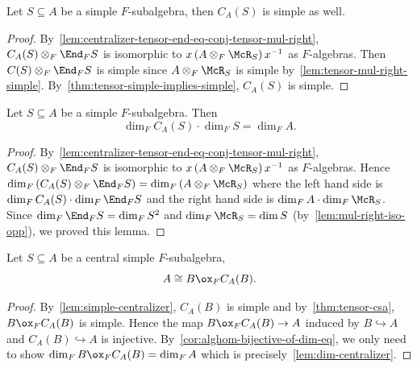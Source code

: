  \begin{lemma}\label{lem:simple-centralizer}
   Let $S\subseteq A$ be a simple $F$-subalgebra, then
   $C_{A}(S)$ is simple as well.
   \leanok
 \end{lemma}

 \begin{proof}
   By~\cref{lem:centralizer-tensor-end-eq-conj-tensor-mul-right},
   $C_{A}(S) \otimes_{F}\End_{F}S$ is isomorphic to
   $x\left(A\otimes_{F}\McR_{S}\right)x^{-1}$ as $F$-algebras. Then
   $C(S)\otimes_{F}\End_{F}S$ is simple since $A\otimes_{F}\McR_{S}$ is simple
   by~\cref{lem:tensor-mul-right-simple}.
   By~\cref{thm:tensor-simple-implies-simple}, $C_{A}(S)$ is simple.
 \end{proof}

 \begin{lemma}
   \label{lem:dim-centralizer}
   Let $S\subseteq A$ be a simple $F$-subalgebra. Then
   \[
     \dim_{F}C_{A}(S)\cdot\dim_{F}S=\dim_{F}A.
   \]
   \leanok
 \end{lemma}
 \begin{proof}
   By~\cref{lem:centralizer-tensor-end-eq-conj-tensor-mul-right},
   $C_{A}(S) \otimes_{F}\End_{F}S$ is isomorphic to
   $x\left(A\otimes_{F}\McR_{S}\right)x^{-1}$ as $F$-algebras. Hence $\dim_{F}\left(C_{A}(S)\otimes_{F}\End_{F}S\right)=\dim_{F}\left(A\otimes_{F}\McR_{S}\right)$ where the left hand side is $\dim_{F}C_{A}(S)\cdot \dim_{F}\End_{F}S$ and the right hand side is $\dim_{F}A\cdot\dim_{F}\McR_{S}$. Since $\dim_{F}\End_{F}S=\dim_{F}S^{2}$ and $\dim_{F}\McR_{S}=\dim S$ (by~\cref{lem:mul-right-iso-opp}), we proved this lemma.
 \end{proof}

\begin{corollary}
  \label{cor:self-tensor-centralizer}
  Let $S \subseteq A$ be a central simple $F$-subalgebra,
  \[
    A \cong B \ox_{F} C_{A}(B).
  \]
  \leanok
\end{corollary}

\begin{proof}
  By~\cref{lem:simple-centralizer}, $C_{A}(B)$ is simple and by~\cref{thm:tensor-csa}, $B \ox_{F} C_{A}(B)$ is simple. Hence the map $B \ox_{F} C_{A}(B) \to A$ induced by $B \hookrightarrow A$ and $C_{A}(B) \hookrightarrow A$ is injective. By~\cref{cor:alghom-bijective-of-dim-eq}, we only need to show $\dim_{F}B\ox_{F}C_{A}(B) =\dim_{F}A$ which is precisely~\cref{lem:dim-centralizer}.
\end{proof}


